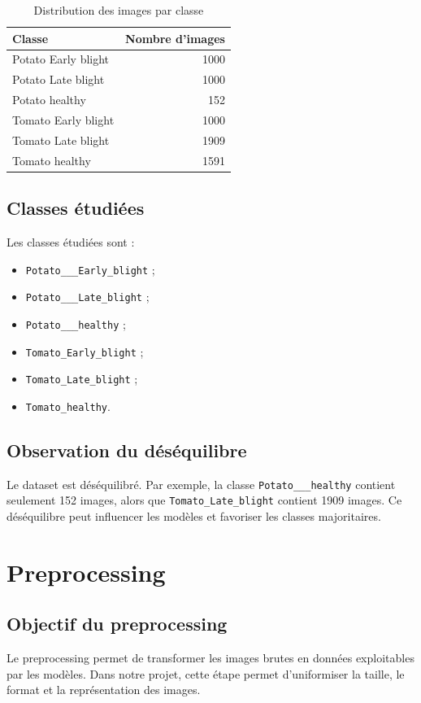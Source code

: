 \documentclass[12pt,a4paper]{report}
\begin{document}
\begin{table}[H]
\centering
\caption{Distribution des images par classe}
\begin{tabular}{lr}
\toprule
\textbf{Classe} & \textbf{Nombre d'images} \\
\midrule
Potato Early blight & 1000 \\
Potato Late blight & 1000 \\
Potato healthy & 152 \\
Tomato Early blight & 1000 \\
Tomato Late blight & 1909 \\
Tomato healthy & 1591 \\
\bottomrule
\end{tabular}
\end{table}

\section{Classes étudiées}
Les classes étudiées sont :
\begin{itemize}
  \item \texttt{Potato\_\_\_Early\_blight} ;
  \item \texttt{Potato\_\_\_Late\_blight} ;
  \item \texttt{Potato\_\_\_healthy} ;
  \item \texttt{Tomato\_Early\_blight} ;
  \item \texttt{Tomato\_Late\_blight} ;
  \item \texttt{Tomato\_healthy}.
\end{itemize}

\section{Observation du déséquilibre}
Le dataset est déséquilibré. Par exemple, la classe \texttt{Potato\_\_\_healthy} contient seulement 152 images, alors que \texttt{Tomato\_Late\_blight} contient 1909 images. Ce déséquilibre peut influencer les modèles et favoriser les classes majoritaires.

\chapter{Preprocessing}

\section{Objectif du preprocessing}
Le preprocessing permet de transformer les images brutes en données exploitables par les modèles. Dans notre projet, cette étape permet d'uniformiser la taille, le format et la représentation des images.
\end{document}

